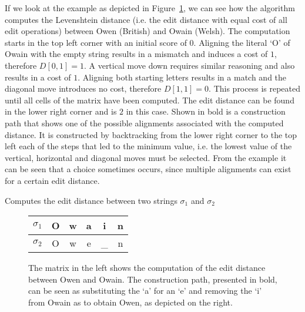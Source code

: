 If we look at the example as depicted in Figure~\ref{fig:edit_distance}, we can see how the algorithm computes the Levenshtein distance (i.e. the edit distance with equal cost of all edit operations) between Owen (British) and Owain (Welsh).
The computation starts in the top left corner with an initial score of $0$.
Aligning the literal `O' of Owain with the empty string results in a mismatch and induces a cost of $1$, therefore $D[0, 1]=1$.
A vertical move down requires similar reasoning and also results in a cost of $1$.
Aligning both starting letters results in a match and the diagonal move introduces no cost, therefore $D[1, 1]=0$.
This process is repeated until all cells of the matrix have been computed.
The edit distance can be found in the lower right corner and is $2$ in this case.
Shown in bold is a construction path that shows one of the possible alignments associated with the computed distance.
It is constructed by backtracking from the lower right corner to the top left each of the steps that led to the minimum value, i.e. the lowest value of the vertical, horizontal and diagonal moves must be selected.
From the example it can be seen that a choice sometimes occurs, since multiple alignments can exist for a certain edit distance.

\begin{algorithm}
    
    \caption{Computes the edit distance between two strings $\sigma_1$ and $\sigma_2$}
    \label{alg:edit_distance}
\end{algorithm}

\begin{figure}
    \centering
    \begin{minipage}{.65\textwidth}
        \centering
        
    \end{minipage}%
    \begin{minipage}{.35\textwidth}
        \centering
        \begin{tabular}{c||c|c|c|c|c}
            $\sigma_1$ & O & w & a & i & n \\\hline
            $\sigma_2$ & O & w & e & \_ & n
        \end{tabular}
    \end{minipage}
    \caption[Example of edit distance]{The matrix in the left shows the computation of the edit distance between Owen and Owain. The construction path, presented in bold, can be seen as substituting the `a' for an `e' and removing the `i' from Owain as to obtain Owen, as depicted on the right.}
    \label{fig:edit_distance}
\end{figure}


